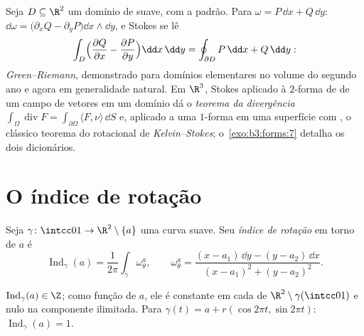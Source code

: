 \begin{example}
\label{ex:b3:forms:classical}
Seja $D \subseteq \R^2$ um domínio  de  suave, com a  padrão.
Para $\omega = P\,\dd x +
Q\,\dd y$: $\dd\omega = \bigl(\partial_xQ -
\partial_yP\bigr)\dd x\wedge\dd y$, e Stokes se lê
\[
\int_D\Bigl(\frac{\partial Q}{\partial x} -
\frac{\partial P}{\partial y}\Bigr)\dd x\,\dd y
= \oint_{\partial D}P\,\dd x + Q\,\dd y :
\]
\emph{Green--Riemann}, demonstrado para domínios elementares no volume
do segundo ano e agora em generalidade natural. Em $\R^3$, Stokes
aplicado à $2$-forma de  de um campo de vetores em um domínio
 dá o \emph{teorema da divergência} $\int_\Omega\operatorname{div}F =
\int_{\partial\Omega}\langle F, \nu\rangle\,\dd S$ e, aplicado a uma
$1$-forma em uma superfície com , o clássico teorema do
rotacional de \emph{Kelvin--Stokes}; o~\cref{exo:b3:forms:7} detalha os dois
dicionários.
\end{example}

\section{O índice de rotação}\label{sec:b3:forms:winding}

\begin{definition}\label{def:b3:forms:winding}
Seja $\gamma\colon\intcc01\to\R^2\setminus\{a\}$ uma curva  suave. Seu \emph{índice de
rotação} em torno de $a$ é
\[
\operatorname{Ind}_\gamma(a) =
\frac1{2\pi}\int_\gamma\omega_\theta^a,
\qquad
\omega_\theta^a = \frac{(x - a_1)\,\dd y - (y - a_2)\,\dd
x}{(x - a_1)^2 + (y - a_2)^2} .
\]
\end{definition}

\begin{proposition}\label{prop:b3:forms:windinginteger}
$\operatorname{Ind}_\gamma(a) \in \Z$; como função de $a$, ele é constante em cada 
de $\R^2\setminus\gamma(\intcc01)$ e nulo na componente ilimitada. Para $\gamma(t) = a + r(\cos2\pi t, \sin2\pi t)$: $\operatorname{Ind}_\gamma(a) = 1$.
\end{proposition}

